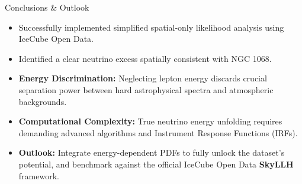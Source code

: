 \begin{frame}{Conclusions \& Outlook}
    
    \vspace{-0.1cm}
    \begin{tcolorbox}[
        colback=green!5!white, 
        colframe=green!60!black, 
        title=A Solid Spatial-Only Baseline,
        boxsep=1pt, top=2pt, bottom=2pt, left=4pt, right=4pt %
    ]
        \small %
        \begin{itemize}
            \item[\checkmark]Successfully implemented simplified spatial-only likelihood analysis using IceCube Open Data.
            \item[\checkmark] Identified a clear neutrino excess spatially consistent with NGC 1068.
        \end{itemize}
    \end{tcolorbox}
    
    
    \begin{tcolorbox}[
        colback=red!5!white, 
        colframe=red!70!black, 
        title=Current Limitations \& Future Directions,
        boxsep=1pt, top=2pt, bottom=2pt, left=4pt, right=4pt %
    ]
        \small
        \begin{itemize}
            \item[!] \textbf{Energy Discrimination:} Neglecting lepton energy discards crucial separation power between hard astrophysical spectra and atmospheric backgrounds.
            \item[!] \textbf{Computational Complexity:} True neutrino energy unfolding requires demanding advanced algorithms and Instrument Response Functions (IRFs).
            \item[!] \textbf{Outlook:} Integrate energy-dependent PDFs to fully unlock the dataset's potential, and benchmark against the official IceCube Open Data \textbf{SkyLLH} framework.
        \end{itemize}
    \end{tcolorbox}
    
\end{frame}